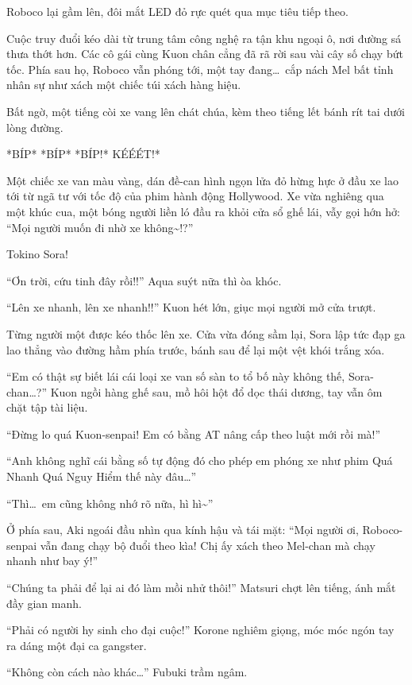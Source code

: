 \documentclass[../main.tex]{subfiles}
\begin{document}
Roboco lại gầm lên, đôi mắt LED đỏ rực quét qua mục tiêu tiếp theo.

Cuộc truy đuổi kéo dài từ trung tâm công nghệ ra tận khu ngoại ô, nơi đường sá thưa thớt hơn. Các cô gái cùng Kuon chân cẳng đã rã rời sau vài cây số chạy bứt tốc. Phía sau họ, Roboco vẫn phóng tới, một tay đang\dots\ cắp nách Mel bất tỉnh nhân sự như xách một chiếc túi xách hàng hiệu.

Bất ngờ, một tiếng còi xe vang lên chát chúa, kèm theo tiếng lết bánh rít tai dưới lòng đường.

*BÍP* *BÍP* *BÍP!* KÉÉÉT!*

Một chiếc xe van màu vàng, dán đề-can hình ngọn lửa đỏ hừng hực ở đầu xe lao tới từ ngã tư với tốc độ của phim hành động Hollywood. Xe vừa nghiêng qua một khúc cua, một bóng người liền ló đầu ra khỏi cửa sổ ghế lái, vẫy gọi hớn hở: ``Mọi người muốn đi nhờ xe không\~{}!?''

Tokino Sora!

``Ơn trời, cứu tinh đây rồi!!'' Aqua suýt nữa thì òa khóc.

``Lên xe nhanh, lên xe nhanh!!'' Kuon hét lớn, giục mọi người mở cửa trượt.

Từng người một được kéo thốc lên xe. Cửa vừa đóng sầm lại, Sora lập tức đạp ga lao thẳng vào đường hầm phía trước, bánh sau để lại một vệt khói trắng xóa.

``Em có thật sự biết lái cái loại xe van số sàn to tổ bố này không thế, Sora-chan\dots?'' Kuon ngồi hàng ghế sau, mồ hôi hột đổ dọc thái dương, tay vẫn ôm chặt tập tài liệu.

``Đừng lo quá Kuon-senpai! Em có bằng AT nâng cấp theo luật mới rồi mà!''

``Anh không nghĩ cái bằng số tự động đó cho phép em phóng xe như phim Quá Nhanh Quá Nguy Hiểm thế này đâu\dots''

``Thì\dots\ em cũng không nhớ rõ nữa, hì hì\~{}''

Ở phía sau, Aki ngoái đầu nhìn qua kính hậu và tái mặt: ``Mọi người ơi, Roboco-senpai vẫn đang chạy bộ đuổi theo kìa! Chị ấy xách theo Mel-chan mà chạy nhanh như bay ý!''

``Chúng ta phải để lại ai đó làm mồi nhử thôi!'' Matsuri chợt lên tiếng, ánh mắt đầy gian manh.


``Phải có người hy sinh cho đại cuộc!'' Korone nghiêm giọng, móc móc ngón tay ra dáng một đại ca gangster.

``Không còn cách nào khác\dots'' Fubuki trầm ngâm.
\end{document}
